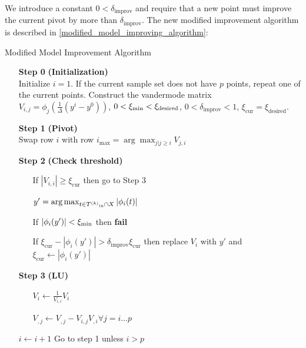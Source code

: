 We introduce a constant $0<\delta_{\text{improv}}$ and require that a new point must improve the current pivot by more than $\delta_{\text{improv}}$.
The new modified improvement algorithm is described in \ref{modified_model_improving_algorithm}:


\begin{algorithm}[H]
    \caption{Modified Model Improvement Algorithm}
    \label{modified_model_improving_algorithm}
    \begin{itemize}
        \item[\textbf{Step 0}] \textbf{(Initialization)} \\
            Initialize $i=1$.
            If the current sample set does not have $p$ points, repeat one of the current points. 
            Construct the vandermode matrix $V_{i,j} = \phi_j(\frac 1 {\Delta}(y^i - y^0))$,
            $0 < \xi_{\text{min}} < \xi_{\text{desired}}$, $0 <\delta_{\text{improv}} < 1$,
            $  \xi_{\text{cur}} = \xi_{\text{desired}}$.
            
        \item[\textbf{Step 1}] \textbf{(Pivot)} \\
            Swap row $i$ with row $i_{\max} = \arg \max_{j|j\ge i} V_{j,i} $
        
        \item[\textbf{Step 2}] \textbf{(Check threshold)} \begin{itemize}
                \item[] If $|V_{i,i}| \ge \xi_{\text{cur}} $ then go to Step 3
                \item[] $y' = \arg\max_{t \in {T^{(k)}}_{\text{in}} \cap X} |\phi_i(t)|$
                \item[] If $\label{impossibly_poised} |\phi_i(y')| < \xi_{\text{min}}$ then \textbf{fail}
                \item[] If $\xi_{\text{cur}} - |\phi_i(y')| > \delta_{\text{improv}} \xi_{\text{cur}}$ then replace $V_i$ with $y'$ and $\xi_{\text{cur}} \gets |\phi_i(y')|$
            \end{itemize}
        
        \item[\textbf{Step 3}] \textbf{(LU)} \begin{itemize}
                \item[] $V_i \gets \frac{1}{V_{i,i}} V_i$
                \item[] $V_{,j} \gets V_{, j} - V_{i,j} V_{, i} \forall j=i \ldots p$
            \end{itemize}
            $i \gets i+1$
            Go to step 1 unless $i > p$
    \end{itemize}
\end{algorithm}


